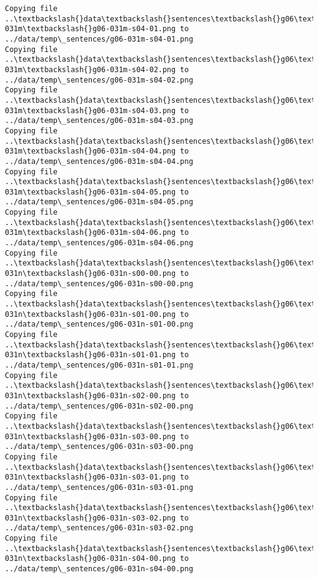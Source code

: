\documentclass[11pt]{article}
\begin{document}
\begin{Verbatim}[commandchars=\\\{\}]
Copying file ..\textbackslash{}data\textbackslash{}sentences\textbackslash{}g06\textbackslash{}g06-031m\textbackslash{}g06-031m-s04-01.png to
../data/temp\_sentences/g06-031m-s04-01.png
Copying file ..\textbackslash{}data\textbackslash{}sentences\textbackslash{}g06\textbackslash{}g06-031m\textbackslash{}g06-031m-s04-02.png to
../data/temp\_sentences/g06-031m-s04-02.png
Copying file ..\textbackslash{}data\textbackslash{}sentences\textbackslash{}g06\textbackslash{}g06-031m\textbackslash{}g06-031m-s04-03.png to
../data/temp\_sentences/g06-031m-s04-03.png
Copying file ..\textbackslash{}data\textbackslash{}sentences\textbackslash{}g06\textbackslash{}g06-031m\textbackslash{}g06-031m-s04-04.png to
../data/temp\_sentences/g06-031m-s04-04.png
Copying file ..\textbackslash{}data\textbackslash{}sentences\textbackslash{}g06\textbackslash{}g06-031m\textbackslash{}g06-031m-s04-05.png to
../data/temp\_sentences/g06-031m-s04-05.png
Copying file ..\textbackslash{}data\textbackslash{}sentences\textbackslash{}g06\textbackslash{}g06-031m\textbackslash{}g06-031m-s04-06.png to
../data/temp\_sentences/g06-031m-s04-06.png
Copying file ..\textbackslash{}data\textbackslash{}sentences\textbackslash{}g06\textbackslash{}g06-031n\textbackslash{}g06-031n-s00-00.png to
../data/temp\_sentences/g06-031n-s00-00.png
Copying file ..\textbackslash{}data\textbackslash{}sentences\textbackslash{}g06\textbackslash{}g06-031n\textbackslash{}g06-031n-s01-00.png to
../data/temp\_sentences/g06-031n-s01-00.png
Copying file ..\textbackslash{}data\textbackslash{}sentences\textbackslash{}g06\textbackslash{}g06-031n\textbackslash{}g06-031n-s01-01.png to
../data/temp\_sentences/g06-031n-s01-01.png
Copying file ..\textbackslash{}data\textbackslash{}sentences\textbackslash{}g06\textbackslash{}g06-031n\textbackslash{}g06-031n-s02-00.png to
../data/temp\_sentences/g06-031n-s02-00.png
Copying file ..\textbackslash{}data\textbackslash{}sentences\textbackslash{}g06\textbackslash{}g06-031n\textbackslash{}g06-031n-s03-00.png to
../data/temp\_sentences/g06-031n-s03-00.png
Copying file ..\textbackslash{}data\textbackslash{}sentences\textbackslash{}g06\textbackslash{}g06-031n\textbackslash{}g06-031n-s03-01.png to
../data/temp\_sentences/g06-031n-s03-01.png
Copying file ..\textbackslash{}data\textbackslash{}sentences\textbackslash{}g06\textbackslash{}g06-031n\textbackslash{}g06-031n-s03-02.png to
../data/temp\_sentences/g06-031n-s03-02.png
Copying file ..\textbackslash{}data\textbackslash{}sentences\textbackslash{}g06\textbackslash{}g06-031n\textbackslash{}g06-031n-s04-00.png to
../data/temp\_sentences/g06-031n-s04-00.png

\end{Verbatim}
\end{document}
